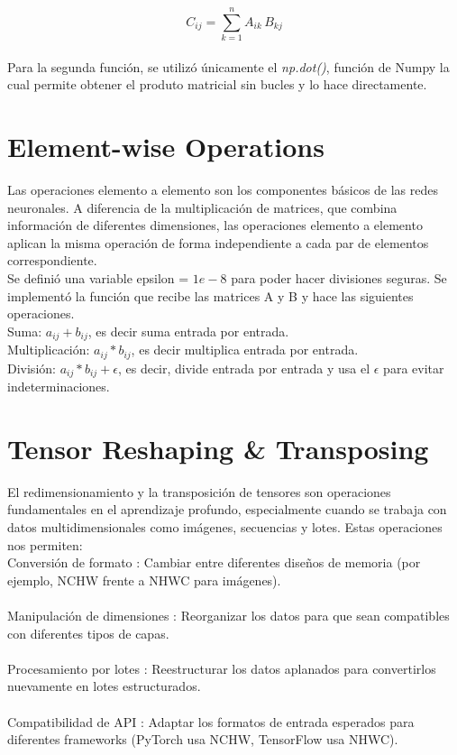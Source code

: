 \documentclass[12pt, letterpaper]{article}
\begin{document}
\[
    C_{ij} = \sum_{k=1}^{n} A_{ik} \, B_{kj}
\] \\ 

Para la segunda función, se utilizó únicamente el \textit{np.dot()}, función de Numpy la cual permite obtener el produto matricial sin bucles y lo hace directamente. 

\newpage

\section{Element-wise Operations}

Las operaciones elemento a elemento son los componentes básicos de las redes neuronales. 
A diferencia de la multiplicación de matrices, que combina información de diferentes dimensiones, las operaciones elemento a elemento aplican la misma operación de forma 
independiente a cada par de elementos correspondiente. \\ 

Se definió una variable epsilon = $1e-8$ para poder hacer divisiones seguras. Se implementó la función que recibe las matrices A y B y hace las siguientes operaciones. \\ 

Suma: $a_{ij} + b_{ij}$, es decir suma entrada por entrada. \\ 

Multiplicación: $a_{ij} * b_{ij}$, es decir multiplica entrada por entrada. \\ 

División: $a_{ij} * b_{ij} + \epsilon$, es decir, divide entrada por entrada y usa el $\epsilon$ para evitar indeterminaciones. \\ 


\newpage

\section{Tensor Reshaping \& Transposing}

El redimensionamiento y la transposición de tensores son operaciones fundamentales en el aprendizaje profundo, especialmente cuando se trabaja con datos 
multidimensionales como imágenes, secuencias y lotes. Estas operaciones nos permiten: \\ 

\noindent Conversión de formato : Cambiar entre diferentes diseños de memoria (por ejemplo, NCHW frente a NHWC para imágenes). \\ \\ 
Manipulación de dimensiones : Reorganizar los datos para que sean compatibles con diferentes tipos de capas. \\ \\ 
Procesamiento por lotes : Reestructurar los datos aplanados para convertirlos nuevamente en lotes estructurados. \\ \\ 
Compatibilidad de API : Adaptar los formatos de entrada esperados para diferentes frameworks (PyTorch usa NCHW, TensorFlow usa NHWC). \\ \\  
\end{document}
